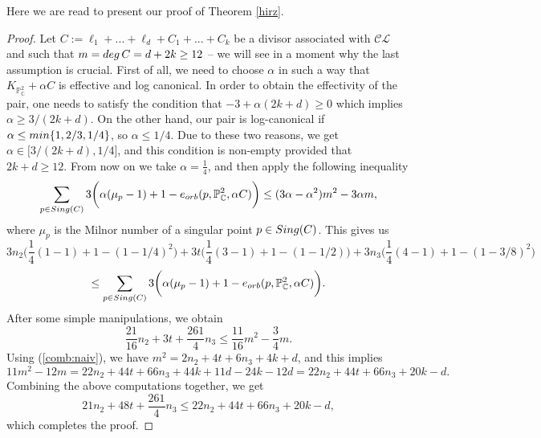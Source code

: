 \documentclass[12pt]{amsart}
\theoremstyle{plain}
\theoremstyle{definition}
\numberwithin{equation}{section}
\begin{document}
Here we are read to present our proof of Theorem \ref{hirz}.
\begin{proof}
Let $C:= \ell_{1} + ... + \ell_{d} + C_{1} + ... + C_{k}$ be a divisor associated with $\mathcal{CL}$ and such that $m = {\rm deg} \, C = d + 2k \geq 12$ -- we will see in a moment why the last assumption is crucial. First of all, we need to choose $\alpha$ in such a way that $K_{\mathbb{P}^{2}_{\mathbb{C}}} + \alpha C$ is effective and log canonical. In order to obtain the effectivity of the pair, one needs to satisfy the condition that $-3 + \alpha(2k+d) \geq 0$ which implies $\alpha \geq 3/(2k+d)$. On the other hand, our pair is log-canonical if $\alpha \leq {\rm min} \{1, 2/3, 1/4\}$, so $\alpha \leq 1/4$. Due to these two reasons, we get $\alpha \in \bigg[3/(2k+d), 1/4 \bigg]$, and this condition is non-empty provided that $2k+d \geq 12$. From now on we take $\alpha = \frac{1}{4}$, and then apply the following inequality
\begin{equation}
\label{logMY}
\sum_{p \in {\rm Sing}(C)}  3\bigg( \alpha (\mu_{p} - 1) + 1 - e_{orb}(p,\mathbb{P}^{2}_{\mathbb{C}}, \alpha C) \bigg) \leq (3\alpha - \alpha^{2})m^{2} - 3\alpha m,
\end{equation}
where $\mu_{p}$ is the Milnor number of a singular point $p \in {\rm Sing}(C)$.
This gives us
$$3n_{2}\bigg(\frac{1}{4}(1-1)+1 - (1-1/4)^{2}\bigg) + 3t\bigg(\frac{1}{4}(3-1)+ 1 - (1-1/2)\bigg) + 3n_{3}\bigg(\frac{1}{4}(4-1) + 1 -(1 - 3/8)^{2}\bigg) $$
$$ \leq \sum_{p \in {\rm Sing}(C)}  3\bigg( \alpha (\mu_{p} - 1) + 1 - e_{orb}(p,\mathbb{P}^{2}_{\mathbb{C}}, \alpha C) \bigg) .$$
After some simple manipulations, we obtain
$$\frac{21}{16}n_{2} + 3t + \frac{261}{4}n_{3} \leq \frac{11}{16}m^{2} - \frac{3}{4}m.$$
Using (\ref{comb:naiv}), we have $m^2 = 2n_{2} + 4t + 6n_{3} + 4k+d$, and this implies 
$$11m^{2} - 12m = 22n_{2}+44t+66n_{3}+44k+11d - 24k - 12d = 22n_{2}+44t + 66n_{3} + 20k - d.$$
Combining the above computations together, we get
$$21n_{2} + 48t + \frac{261}{4}n_{3} \leq 22n_{2} +44t + 66n_{3} +20k - d,$$
which completes the proof.
\end{proof}
\end{document}
